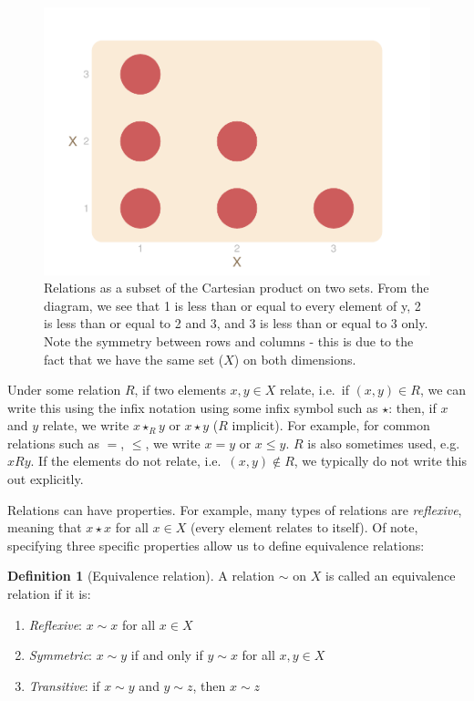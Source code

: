 \documentclass[
]{book}
\providecommand{\tightlist}{%
  \setlength{\itemsep}{0pt}\setlength{\parskip}{0pt}}
\theoremstyle{definition}
\newtheorem{definition}{Definition}[chapter]
\theoremstyle{definition}
\theoremstyle{definition}
\theoremstyle{definition}
\theoremstyle{remark}
\begin{document}
\begin{figure}
\centering
\includegraphics{_main_files/figure-latex/relations-subset-1.pdf}
\caption{\label{fig:relations-subset}Relations as a subset of the Cartesian product on two sets. From the diagram, we see that 1 is less than or equal to every element of y, 2 is less than or equal to 2 and 3, and 3 is less than or equal to 3 only. Note the symmetry between rows and columns - this is due to the fact that we have the same set (\(X\)) on both dimensions.}
\end{figure}

Under some relation \(R\), if two elements \(x, y \in X\) relate, i.e.~if \((x, y) \in R\), we can write this using the infix notation using some infix symbol such as \(\star\): then, if \(x\) and \(y\) relate, we write \(x \star_R y\) or \(x \star y\) (\(R\) implicit). For example, for common relations such as \(=\), \(\leq\), we write \(x = y\) or \(x \leq y\). \(R\) is also sometimes used, e.g.~\(x R y\). If the elements do not relate, i.e.~\((x, y) \not \in R\), we typically do not write this out explicitly.

Relations can have properties. For example, many types of relations are \emph{reflexive}, meaning that \(x \star x\) for all \(x \in X\) (every element relates to itself). Of note, specifying three specific properties allow us to define equivalence relations:

\begin{definition}[Equivalence relation]

A relation \(\sim\) on \(X\) is called an equivalence relation if it is:

\begin{enumerate}
\def\labelenumi{\arabic{enumi}.}
\tightlist
\item
  \emph{Reflexive}: \(x \sim x\) for all \(x \in X\)
\item
  \emph{Symmetric}: \(x \sim y\) if and only if \(y \sim x\) for all \(x, y \in X\)
\item
  \emph{Transitive}: if \(x \sim y\) and \(y \sim z\), then \(x \sim z\)
\end{enumerate}

\end{definition}
\end{document}
